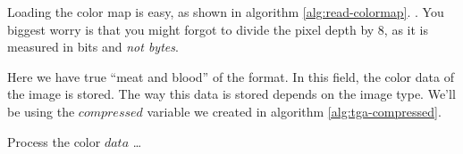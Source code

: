 \begin{refsection}
  Loading the color map is easy, as shown in algorithm
  \ref{alg:read-colormap}. . You
  biggest worry is that you might forgot to divide the pixel depth by
  8, as it is measured in bits and \textit{not bytes}.

  \begin{algorithm}[H]
    \caption{Reading the color map of a \tga file.}
    \label{alg:read-colormap}
    \begin{algorithmic}[1]
      \State {}
      \EndFor
    \end{algorithmic}
  \end{algorithm}


  Here we have true ``meat and blood'' of the \tga format. In this
  field, the color data of the image is stored. The way this data is
  stored depends on the image type. We'll be using the $compressed$
  variable we created in algorithm \ref{alg:tga-compressed}.

  \begin{algorithm}[H]
    \caption{Reading the color data of a \tga file.}
    \label{alg:TGA-read-colordata}
    \newcommand{\process}{\State Process the color $data$ \dots}
    \begin{algorithmic}[1]




            \EndIf


              \process


            \EndRepeatn

          \Else




\end{algorithmic}
\end{algorithm}
\end{refsection}
